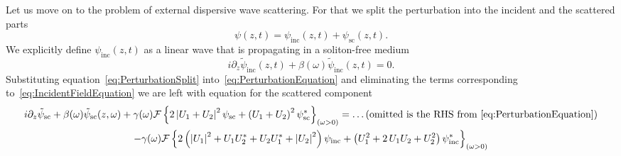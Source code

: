 \documentclass[aps, prl, twocolumn, superscriptaddress, final]{revtex4}
\newcommand{\abs}[1]{\left| #1 \right|}
\begin{document}
\begin{widetext}
Let us move on to the problem of external dispersive wave scattering. For that we split the perturbation into the incident and the scattered parts
\begin{equation}
  \label{eq:PerturbationSplit}
  \psi(z, t) = \psi_{\text{inc}}(z, t) + \psi_{\text{sc}}(z, t).
\end{equation}
We explicitly define $\psi_{\text{inc}}(z, t)$ as a linear wave that is propagating in a soliton-free medium
\begin{equation}
  \label{eq:IncidentFieldEquation}
  i \partial_{z} \tilde \psi_{\text{inc}}(z, t)
    + \beta(\omega) \tilde \psi_{\text{inc}}(z, t) = 0.
\end{equation}
Substituting equation~\eqref{eq:PerturbationSplit} into~\eqref{eq:PerturbationEquation} and eliminating the terms corresponding to~\eqref{eq:IncidentFieldEquation} we are left with equation for the scattered component
\begin{multline}
  \label{eq:ScatteredFieldEquation}
  i \partial_{z} \tilde \psi_{\text{sc}}
    + \beta(\omega) \tilde \psi_{\text{sc}}(z, \omega)
    + \gamma(\omega) \mathcal{F}\left\{
      2 \abs{U_{1} + U_{2}}^{2} \psi_{\text{sc}} +
      \left( U_{1} + U_{2} \right)^{2} \psi_{\text{sc}}^{*}
    \right\}_{(\omega > 0)} = \text{\ldots (omitted is the RHS from~\eqref{eq:PerturbationEquation})} \\
    - \gamma(\omega) \mathcal{F}\left\{
      2 \left(
        \abs{U_{1}}^{2} + U_{1} U_{2}^{*} + U_{2} U_{1}^{*} + \abs{U_{2}}^{2}
      \right) \psi_{\text{inc}} +
      \left(
        U_{1}^{2} + 2 \, U_{1} U_{2} + U_{2}^{2}
      \right) \psi_{\text{inc}}^{*}
    \right\}_{(\omega > 0)}
\end{multline}
\end{widetext}
\end{document}
